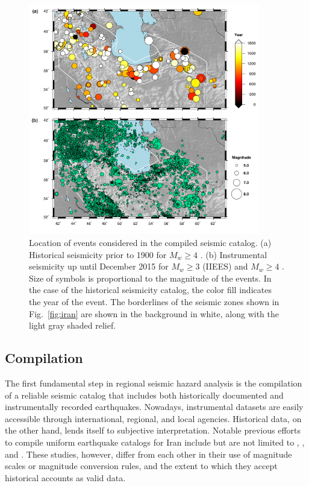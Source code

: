 
\begin{figure}[t] 
	\centering
	\includegraphics[width=0.9\textwidth]{figures/pdf/figure-03}
	\caption{Location of events considered in the compiled seismic catalog. (a) Historical seismicity prior to 1900 for $M_w \geq 4$ \citep[after][]{Zare2014}. (b) Instrumental seismicity up until December 2015 for $M_w \geq 3$ (IIEES) and $M_w \geq 4$ \citep[after][]{Zare2014}. Size of symbols is proportional to the magnitude of the events. In the case of the historical seismicity catalog, the color fill indicates the year of the event. The borderlines of the seismic zones shown in Fig.~\ref{fig:iran} are shown in the background in white, along with the light gray shaded relief.}
	\label{fig:catalog}
\end{figure}

\subsection{Compilation}

The first fundamental step in regional seismic hazard analysis is the compilation of a reliable seismic catalog that includes both historically documented and instrumentally recorded earthquakes. Nowadays, instrumental datasets are easily accessible through international, regional, and local agencies. Historical data, on the other hand, lends itself to subjective interpretation. Notable previous efforts to compile uniform earthquake catalogs for Iran include but are not limited to \citet{Ambraseys_1982_Book}, \citet{moinfar1994}, and \citet{Berberian_1995_Tech}. These studies, however, differ from each other in their use of magnitude scales or magnitude conversion rules, and the extent to which they accept historical accounts as valid data. 


